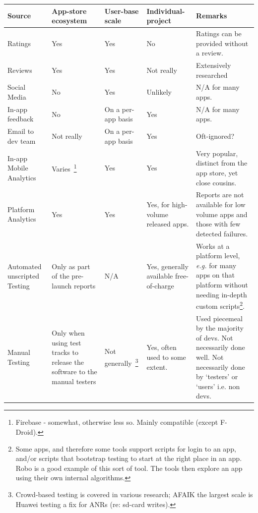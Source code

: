 \begin{table}[H]
	\setlength\tabcolsep{0.4em} %
	\def\arraystretch{1}%
	\scriptsize %
	\begin{tabular}{L{2cm} L{2.4cm} L{3.5cm} L{2.4cm} L{3.5cm}} %
		\toprule
		\textbf{Source} & \textbf{App-store ecosystem} & \textbf{User-base scale} & \textbf{Individual-project} & \textbf{Remarks} \\ \midrule
		Ratings & Yes & Yes & No & Ratings can be provided without a review. \\ \midrule
		Reviews & Yes & Yes & Not really & Extensively researched \\ \midrule
		Social Media & No & Yes & Unlikely & N/A for many apps. \\ \midrule
		In-app feedback & No & On a per-app basis & Yes & N/A for many apps. \\ \midrule
		Email to dev team & Not really & On a per-app basis & Yes & Oft-ignored? \\ \midrule
		In-app Mobile Analytics & Varies~\footnote{Firebase - somewhat, otherwise less so. Mainly compatible (except F-Droid).} & Yes & Yes & Very popular, distinct from the app store, yet close cousins. \\ \midrule
		Platform Analytics & Yes & Yes & Yes, for high-volume released apps. & Reports are not available for low volume apps and those with few detected failures.  \\ \midrule
		Automated unscripted Testing & Only as part of the pre-launch reports & N/A & Yes, generally available free-of-charge & Works at a platform level, \emph{e.g.} for many apps on that platform without needing in-depth custom scripts\footnote{ Some apps, and therefore some tools support scripts for login to an app, and/or scripts that bootstrap testing to start at the right place in an app. Robo is a good example of this sort of tool. The tools then explore an app using their own internal algorithms.}. \\ \midrule
		Manual Testing & Only when using test tracks to release the software to the manual testers & Not generally~\footnote{Crowd-based testing is covered in various research; AFAIK the largest scale is Huawei testing a fix for ANRs (re: sd-card writes).} & Yes, often used to some extent. & Used piecemeal by the majority of devs. Not necessarily done well. Not necessarily done by ‘testers’ or ‘users’ i.e. non devs. \\ \midrule

\end{tabular}
\end{table}
